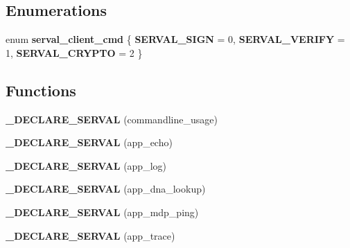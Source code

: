 \subsection*{Enumerations}
\begin{DoxyCompactItemize}
\item 
enum {\bfseries serval\-\_\-client\-\_\-cmd} \{ {\bfseries S\-E\-R\-V\-A\-L\-\_\-\-S\-I\-G\-N} = 0, 
{\bfseries S\-E\-R\-V\-A\-L\-\_\-\-V\-E\-R\-I\-F\-Y} = 1, 
{\bfseries S\-E\-R\-V\-A\-L\-\_\-\-C\-R\-Y\-P\-T\-O} = 2
 \}
\end{DoxyCompactItemize}
\subsection*{Functions}
\begin{DoxyCompactItemize}
\item 
\hypertarget{serval-client_8c_a9040e30dd1c35c49c74ed65afd7e1258}{{\bfseries \-\_\-\-D\-E\-C\-L\-A\-R\-E\-\_\-\-S\-E\-R\-V\-A\-L} (commandline\-\_\-usage)}\label{serval-client_8c_a9040e30dd1c35c49c74ed65afd7e1258}

\item 
\hypertarget{serval-client_8c_a34be79686df2478845168fe7ed97899d}{{\bfseries \-\_\-\-D\-E\-C\-L\-A\-R\-E\-\_\-\-S\-E\-R\-V\-A\-L} (app\-\_\-echo)}\label{serval-client_8c_a34be79686df2478845168fe7ed97899d}

\item 
\hypertarget{serval-client_8c_a2f6378cb8fc2e482bf773279d2d504c7}{{\bfseries \-\_\-\-D\-E\-C\-L\-A\-R\-E\-\_\-\-S\-E\-R\-V\-A\-L} (app\-\_\-log)}\label{serval-client_8c_a2f6378cb8fc2e482bf773279d2d504c7}

\item 
\hypertarget{serval-client_8c_ac6981d742dfc0c0db6d721a4a637af07}{{\bfseries \-\_\-\-D\-E\-C\-L\-A\-R\-E\-\_\-\-S\-E\-R\-V\-A\-L} (app\-\_\-dna\-\_\-lookup)}\label{serval-client_8c_ac6981d742dfc0c0db6d721a4a637af07}

\item 
\hypertarget{serval-client_8c_a3e70fab69572efef33d4b4d3fc40ced7}{{\bfseries \-\_\-\-D\-E\-C\-L\-A\-R\-E\-\_\-\-S\-E\-R\-V\-A\-L} (app\-\_\-mdp\-\_\-ping)}\label{serval-client_8c_a3e70fab69572efef33d4b4d3fc40ced7}

\item 
\hypertarget{serval-client_8c_a12a9edfc9e42fe68ec5cb1dd23fe0471}{{\bfseries \-\_\-\-D\-E\-C\-L\-A\-R\-E\-\_\-\-S\-E\-R\-V\-A\-L} (app\-\_\-trace)}\label{serval-client_8c_a12a9edfc9e42fe68ec5cb1dd23fe0471}


\end{DoxyCompactItemize}
